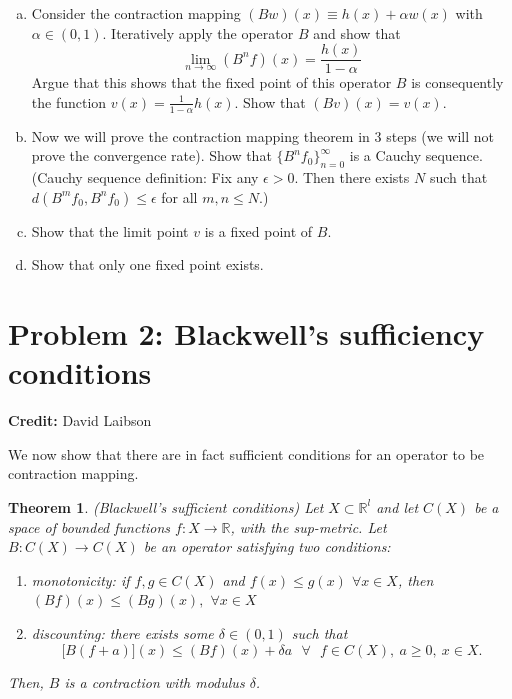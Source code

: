 \documentclass[11pt]{extarticle}
\theoremstyle{plain}
\newtheorem{thm}{Theorem}
\theoremstyle{definition}
\begin{document}
\begin{enumerate}[(a)]
\item Consider the contraction mapping $(Bw)(x) \equiv h(x) + \alpha w(x)$ with $\alpha \in (0, 1)$. Iteratively apply the operator $B$ and show that 
\begin{equation*}
	\lim_{n \to \infty} (B^n f)(x) = \frac{h(x)}{1-\alpha}
\end{equation*}
Argue that this shows that the fixed point of this operator $B$ is consequently the function $v(x) = \frac{1}{1-\alpha} h(x)$. Show that $(Bv)(x) = v(x)$. 


\item Now we will prove the contraction mapping theorem in 3 steps (we will not prove the convergence rate). Show that $\{ B^n f_0\}_{n=0}^\infty$ is a Cauchy sequence. (Cauchy sequence definition: Fix any $\epsilon > 0$. Then there exists $N$ such that $d(B^m f_0, B^n f_0) \leq \epsilon$ for all $m, n \leq N$.) 


\item Show that the limit point $v$ is a fixed point of $B$. 

\item Show that only one fixed point exists. 


\end{enumerate}




\vspace{10mm}
\section*{Problem 2: Blackwell's sufficiency conditions}

\textbf{Credit:} David Laibson


\vspace{5mm}
\noindent
We now show that there are in fact sufficient conditions for an operator to be contraction mapping.

\begin{thm}
	
	(Blackwell's sufficient conditions) Let $X \subset \mathbb R^l$ and let $C(X)$ be a space of bounded functions $f:X \to \mathbb R$, with the sup-metric. Let $B : C(X) \to C(X)$ be an operator satisfying two conditions:
	\begin{enumerate}[1.]
		\item monotonicity: if $f,g\in C(X)$ and $f(x)\leq g(x)$ $\forall x\in X$,%
		\newline
		then $(Bf)(x)\leq (Bg)(x),$ $\forall x\in X$\newline
		
		\item discounting: there exists some $\delta \in (0,1)$ such that 
		\[
		\lbrack B(f+a)](x)\leq (Bf)(x)+\delta a\text{ \ }\forall \text{ }f\in C(X),\
		a\geq 0,\ x\in X. 
		\]%
	\end{enumerate}
	
	\noindent
	Then, $B$ is a contraction with modulus $\delta$.
\end{thm}
\end{document}

